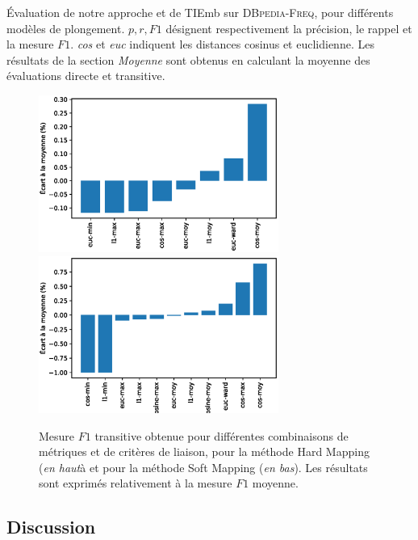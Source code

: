
\begin{table}
    \centering
    \caption{
    Évaluation de notre approche et de TIEmb sur \textsc{DBpedia-Freq}, pour différents modèles de plongement. $p, r, F1$ désignent respectivement la précision, le rappel et la mesure $F1$. \textit{cos} et \textit{euc} indiquent les distances cosinus et euclidienne. Les résultats de la section \textit{Moyenne} sont obtenus en calculant la moyenne des évaluations directe et transitive.}
    
    \label{tab:te-results}
\end{table}


\begin{figure}
    \centering
    \includegraphics[width=0.7\textwidth]{fig/plot/taxex_cluster-params_HM.eps}
    \includegraphics[width=0.7\textwidth]{fig/plot/taxex_cluster-params_SM.eps}
    \caption{Mesure $F1$ transitive obtenue pour différentes combinaisons de métriques et de critères de liaison, pour la méthode Hard Mapping (\textit{en haut}à et pour la méthode Soft Mapping (\textit{en bas}). Les résultats sont exprimés relativement à la mesure $F1$ moyenne.}
    \label{fig:taxex-cluparams-HM}
\end{figure}


\subsection{Discussion}
\label{subsec:te-discussion}

